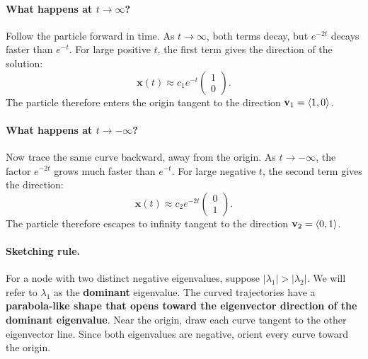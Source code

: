 \documentclass[10pt,letterpaper]{article}
\begin{document}
\paragraph{What happens at $t\to\infty$?}
Follow the particle forward in time. As $t\to\infty$, both terms
decay, but $e^{-2t}$ decays faster than $e^{-t}$. For large positive
$t$, the first term gives the direction of the solution:
\[
    \mathbf{x}(t)\approx
    c_1e^{-t}\begin{pmatrix}1\\0\end{pmatrix}.
\]
The particle therefore enters the origin tangent to the direction $\textbf{v}_1=\left\langle 1,0\right\rangle$.

\paragraph{What happens at $t\to-\infty$?}
Now trace the same curve backward, away from the origin. As
$t\to-\infty$, the factor $e^{-2t}$ grows much faster than $e^{-t}$.
For large negative $t$, the second term gives the direction:
\[
    \mathbf{x}(t)\approx
    c_2e^{-2t}\begin{pmatrix}0\\1\end{pmatrix}.
\]
The particle therefore escapes to infinity tangent to the direction $\textbf{v}_2=\left\langle 0,1\right\rangle$.

\paragraph{Sketching rule.}
For a node with two distinct negative eigenvalues, suppose $|\lambda_1|>|\lambda_2|$. 
We will refer to $\lambda_1$ as the \textbf{dominant} eigenvalue. The curved trajectories have a
\textbf{parabola-like shape that opens toward the eigenvector direction
of the dominant eigenvalue}. Near the origin, draw each curve tangent
to the other eigenvector line. Since both eigenvalues are negative,
orient every curve toward the origin.

\end{document}
